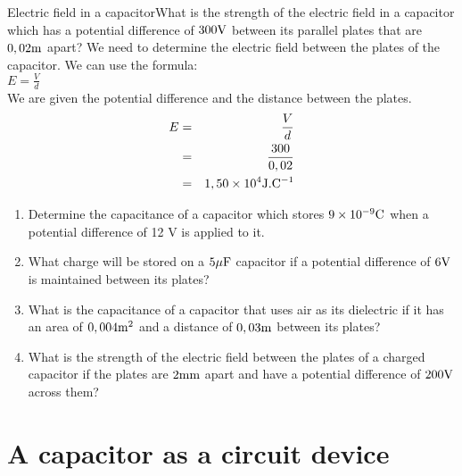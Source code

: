 \begin{wex}{Electric field in a capacitor}{What is the strength of the electric field in a capacitor which has a potential difference of $300 {\rm V}$ between its parallel plates that are $0,02 {\rm m}$ apart?}{
We need to determine the electric field between the plates of the capacitor.
We can use the formula:\\
$E = \frac{V}{d}$\\
We are given the potential difference and the distance between the plates.
\begin{eqnarray}
E &=&\frac{V}{d}\\
&=& \frac {300}{0,02}\\
&=& 1,50 \times 10^{4} {\rm J.C^{-1}}\\
\end{eqnarray}
}
\end{wex}


{
\begin{enumerate}
\item
Determine the capacitance of a capacitor which stores $9 \times 10^{-9} {\rm C}$
when a potential difference of 12 V is applied to it.
\item 
What charge will be stored on a $5 {\rm \mu F}$ capacitor if a potential
difference of $6 {\rm V}$ is maintained between its plates?
\item
What is the capacitance of a capacitor that uses air as its dielectric if it has an area of $0,004 {\rm m^2}$ and a distance of $0,03 {\rm m}$ between its plates?
\item
What is the strength of the electric field between the plates of a charged capacitor if the plates are $2 {\rm mm}$ apart and have a potential difference of $200 {\rm V}$ across them?
\end{enumerate}
}

\section{A capacitor as a circuit device}

